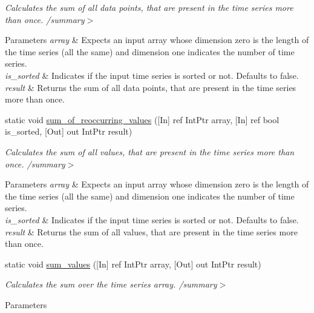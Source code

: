 \begin{DoxyCompactItemize}
\begin{DoxyCompactList}\small\item\em Calculates the sum of all data points, that are present in the time series more than once. /summary$>$ 
\begin{DoxyParams}{Parameters}
{\em array} & Expects an input array whose dimension zero is the length of the time series (all the same) and dimension one indicates the number of time series.\\
\hline
{\em is\+\_\+sorted} & Indicates if the input time series is sorted or not. Defaults to false.\\
\hline
{\em result} & Returns the sum of all data points, that are present in the time series more than once.\\
\hline
\end{DoxyParams}
\end{DoxyCompactList}\item 
static void \mbox{\hyperlink{classkhiva_1_1interop_1_1_d_l_l_features_a00a99ef3e65334993b4c129f0835349d}{sum\+\_\+of\+\_\+reoccurring\+\_\+values}} (\mbox{[}In\mbox{]} ref Int\+Ptr array, \mbox{[}In\mbox{]} ref bool is\+\_\+sorted, \mbox{[}Out\mbox{]} out Int\+Ptr result)
\begin{DoxyCompactList}\small\item\em Calculates the sum of all values, that are present in the time series more than once. /summary$>$ 
\begin{DoxyParams}{Parameters}
{\em array} & Expects an input array whose dimension zero is the length of the time series (all the same) and dimension one indicates the number of time series.\\
\hline
{\em is\+\_\+sorted} & Indicates if the input time series is sorted or not. Defaults to false.\\
\hline
{\em result} & Returns the sum of all values, that are present in the time series more than once.\\
\hline
\end{DoxyParams}
\end{DoxyCompactList}\item 
static void \mbox{\hyperlink{classkhiva_1_1interop_1_1_d_l_l_features_a79a476c0ef597cb23f7cd34836fd1fa7}{sum\+\_\+values}} (\mbox{[}In\mbox{]} ref Int\+Ptr array, \mbox{[}Out\mbox{]} out Int\+Ptr result)
\begin{DoxyCompactList}\small\item\em Calculates the sum over the time series array. /summary$>$ 
\begin{DoxyParams}{Parameters}

\end{DoxyParams}
\end{DoxyCompactList}
\end{DoxyCompactItemize}
